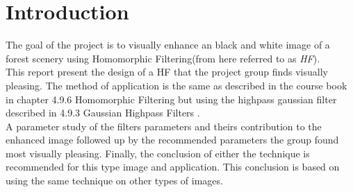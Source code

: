 \section{Introduction}

The goal of the project is to visually enhance an black and white image of a forest scenery using Homomorphic Filtering(from here referred to as \textit{HF}). \\

This report present the design of a HF that the project group finds visually pleasing. 
The method of application is the same as described in the course book in chapter 4.9.6 Homomorphic Filtering but using the highpass gaussian filter described in 4.9.3 Gaussian Highpass Filters \cite{dipBook}. \\

A parameter study of the filters parameters and theirs contribution to the enhanced image followed up by the recommended parameters the group found most visually pleasing. Finally, the conclusion of either the technique is recommended for this type image and application. This conclusion is based on using the same technique on other types of images.